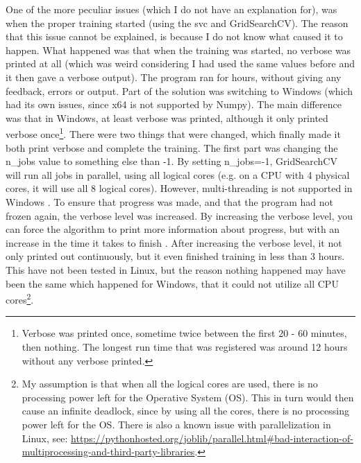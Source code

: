 \vspace{0.5em}\newline
One of the more peculiar issues (which I do not have an explanation for), was when the proper training started (using the \gls{svc} and GridSearchCV).
The reason that this issue cannot be explained, is because I do not know what caused it to happen.
What happened was that when the training was started, no verbose was printed at all (which was weird considering I had used the same values before and it then gave a verbose output). 
The program ran for hours, without giving any feedback, errors or output. 
\vspace{0.5em}\newline
Part of the solution was switching to Windows (which had its own issues, since x64 is not supported by Numpy).
The main difference was that in Windows, at least verbose was printed, although it only printed verbose once\footnote{
	Verbose was printed once, sometime twice between the first 20 - 60 minutes, then nothing.
	The longest run time that was registered was around 12 hours without any verbose printed.
}.
There were two things that were changed, which finally made it both print verbose and complete the training.
The first part was changing the n\_jobs value to something else than -1. 
By setting n\_jobs=-1, GridSearchCV will run all jobs in parallel, using all logical cores (e.g. on a CPU with 4 physical cores, it will use all 8 logical cores). 
However, multi-threading is not supported in Windows \cite{GS2015}. 
To ensure that progress was made, and that the program had not frozen again, the verbose level was increased.
By increasing the verbose level, you can force the algorithm to print more information about progress, but with an increase in the time it takes to finish \cite{Manuel2015, user29912432014}. 
After increasing the verbose level, it not only printed out continuously, but it even finished training in less than 3 hours.
This have not been tested in Linux, but the reason nothing happened may have been the same which happened for Windows, that it could not utilize all CPU cores\footnote{
	My assumption is that when all the logical cores are used, there is no processing power left for the Operative System (OS). 
	This in turn would then cause an infinite deadlock, since by using all the cores, there is no processing power left for the OS.
	There is also a known issue with parallelization in Linux, see: 
	\url{https://pythonhosted.org/joblib/parallel.html\#bad-interaction-of-multiprocessing-and-third-party-libraries}.
}.
